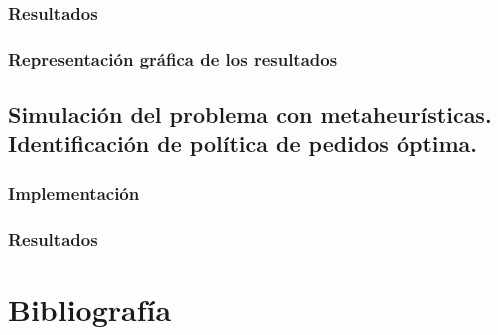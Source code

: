 \documentclass[a4paper,12pt]{article}
\begin{document}
	\subsubsection{Resultados}
	
	\subsubsection{Representación gráfica de los resultados}
	
	
	\subsection{Simulación del problema con metaheurísticas. Identificación de política de pedidos óptima.}
	
	\subsubsection{Implementación}
	
	\subsubsection{Resultados}
	
\newpage
	\section*{Bibliografía}
	
	
	
\end{document}
